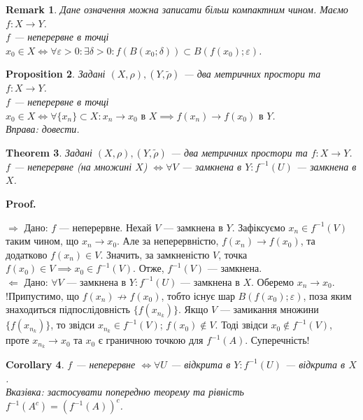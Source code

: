 \documentclass[a4paper, 10pt]{article}
\makeatletter
\def\rightproof{$\boxed{\Rightarrow}$ }
\def\leftproof{$\boxed{\Leftarrow}$ }
\theoremstyle{theoremdd}
\newtheorem{theorem}{Theorem}[subsection]
\theoremstyle{theoremdd}
\theoremstyle{theoremdd}
\theoremstyle{theoremdd}
\theoremstyle{theoremdd}
\newtheorem{proposition}[theorem]{Proposition}
\theoremstyle{theoremdd}
\newtheorem{remark}[theorem]{Remark}
\theoremstyle{theoremdd}
\theoremstyle{theoremdd}
\newtheorem{corollary}[theorem]{Corollary}
\renewenvironment{proof}[1][Proof.\\]{\par
\pushQED{\hfill \qed}%
\normalfont \topsep6\p@\@plus6\p@\relax
\trivlist
\item\relax
{\bfseries
#1\@addpunct{.}}\hspace\labelsep\ignorespaces
}{%
\popQED\endtrivlist\@endpefalse
}
\makeatother
\begin{document}
\begin{remark}
Дане означення можна записати більш компактним чином. Маємо $f \colon X \to Y$.\\
$f$ --- неперервне в точці $x_0 \in X \iff \forall \varepsilon > 0: \exists \delta > 0: f(B(x_0;\delta)) \subset B(f(x_0);\varepsilon)$.
\end{remark}

\begin{proposition}
Задані $(X,\rho), (Y,\tilde{\rho})$ --- два метричних простори та $f \colon X \to Y$.\\
$f$ --- неперервне в точці $x_0 \in X \iff \forall \{x_n\} \subset X: x_n \to x_0 \text{ в } X \implies f(x_n) \to f(x_0) \text{ в } Y$.\\
\textit{Вправа: довести.}
\end{proposition}

\begin{theorem}
Задані $(X,\rho), (Y,\tilde{\rho})$ --- два метричних простори та $f \colon X \to Y$.\\
$f$ --- неперервне (на множині $X$) $\iff \forall V$ --- замкнена в $Y: f^{-1}(U)$ --- замкнена в $X$.
\end{theorem}

\begin{proof}
\rightproof Дано: $f$ --- неперервне. Нехай $V$ --- замкнена в $Y$. Зафіксуємо $x_n \in f^{-1}(V)$ таким чином, що $x_n \to x_0$. Але за неперервністю, $f(x_n) \to f(x_0)$, та додатково $f(x_n) \in V$. Значить, за замкненістю $V$, точка $f(x_0) \in V \implies x_0 \in f^{-1}(V)$. Отже, $f^{-1}(V)$ --- замкнена.
\bigskip \\
\leftproof Дано: $\forall V$ --- замкнена в $Y: f^{-1}(U)$ --- замкнена в $X$. Оберемо $x_n \to x_0$.\\
!Припустимо, що $f(x_n) \not\to f(x_0)$, тобто існує шар $B(f(x_0);\varepsilon)$, поза яким знаходиться підпослідовність $\{f(x_{n_k})\}$. Якщо $V$ --- замикання множини $\{f(x_{n_k})\}$, то звідси $x_{n_k} \in f^{-1}(V)$; $f(x_0) \notin V$. Тоді звідси $x_0 \notin f^{-1}(V)$, проте $x_{n_k} \to x_0$ та $x_0$ є граничною точкою для $f^{-1}(A)$. Суперечність!
\end{proof}

\begin{corollary}
$f$ --- неперервне $\iff \forall U$ --- відкрита в $Y: f^{-1}(U)$ --- відкрита в $X$.\\
\textit{Вказівка: застосувати попередню теорему та рівність $f^{-1}(A^c) = (f^{-1}(A))^c$.}
\end{corollary}
\end{document}
